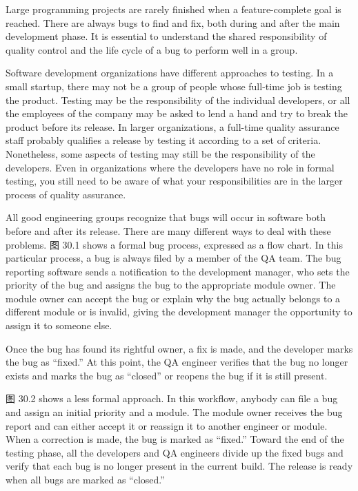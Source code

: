 
Large programming projects are rarely finished when a feature-complete goal is reached. There are always bugs to find and fix, both during and after the main development phase. It is essential to understand the shared responsibility of quality control and the life cycle of a bug to perform well in a group.


Software development organizations have different approaches to testing. In a small startup, there may not be a group of people whose full-time job is testing the product. Testing may be the responsibility of the individual developers, or all the employees of the company may be asked to lend a hand and try to break the product before its release. In larger organizations, a full-time quality assurance staff probably qualifies a release by testing it according to a set of criteria. Nonetheless, some aspects of testing may still be the responsibility of the developers. Even in organizations where the developers have no role in formal testing, you still need to be aware of what your responsibilities are in the larger process of quality assurance.


All good engineering groups recognize that bugs will occur in software both before and after its release. There are many different ways to deal with these problems. 图 30.1 shows a formal bug process, expressed as a flow chart. In this particular process, a bug is always filed by a member of the QA team. The bug reporting software sends a notification to the development manager, who sets the priority of the bug and assigns the bug to the appropriate module owner. The module owner can accept the bug or explain why the bug actually belongs to a different module or is invalid, giving the development manager the opportunity to assign it to someone else.

Once the bug has found its rightful owner, a fix is made, and the developer marks the bug as “fixed.” At this point, the QA engineer verifies that the bug no longer exists and marks the bug as “closed” or reopens the bug if it is still present.


图 30.2 shows a less formal approach. In this workflow, anybody can file a bug and assign an initial priority and a module. The module owner receives the bug report and can either accept it or reassign it to another engineer or module. When a correction is made, the bug is marked as “fixed.” Toward the end of the testing phase, all the developers and QA engineers divide up the fixed bugs and verify that each bug is no longer present in the current build. The release is ready when all bugs are marked as “closed.”


